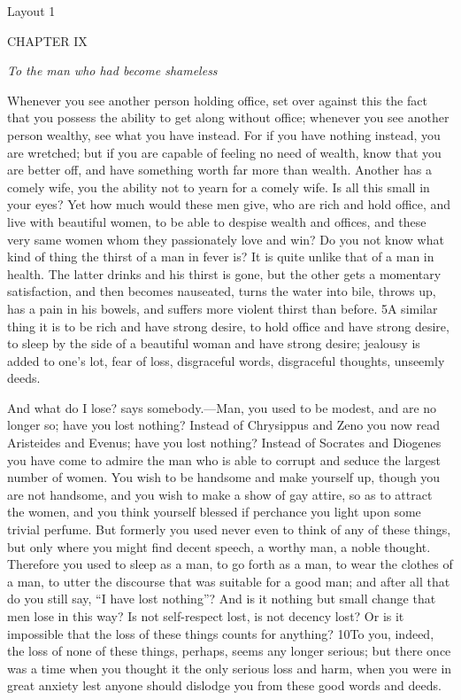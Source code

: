 

Layout 1

CHAPTER IX

\emph{To the man who had become shameless}

Whenever you see another person holding office, set over against this the fact that you possess the ability to get along without office; whenever you see another person wealthy, see what you have instead. For if you have nothing instead, you are wretched; but if you are capable of feeling no need of wealth, know that you are better off, and have something worth far more than wealth. Another has a comely wife, you the ability not to yearn for a comely wife. Is all this small in your eyes? Yet how much would these men give, who are rich and hold office, and live with beautiful women, to be able to despise wealth and offices, and these very same women whom they passionately love and win? Do you not know what kind of thing the thirst of a man in fever is? It is quite unlike that of a man in health. The latter drinks and his thirst is gone, but the other gets a momentary satisfaction, and then becomes nauseated, turns the water into bile, throws up, has a pain in his bowels, and suffers more violent thirst than before. 5A similar thing it is to be rich and have strong desire, to hold office and have strong desire, to sleep by the side of a beautiful woman and have strong desire; jealousy is added to one's lot, fear of loss, disgraceful words, disgraceful thoughts, unseemly deeds.

And what do I lose? says somebody.—Man, you used to be modest, and are no longer so; have you lost nothing? Instead of Chrysippus and Zeno you now read Aristeides and Evenus; have you lost nothing? Instead of Socrates and Diogenes you have come to admire the man who is able to corrupt and seduce the largest number of women. You wish to be handsome and make yourself up, though you are not handsome, and you wish to make a show of gay attire, so as to attract the women, and you think yourself blessed if perchance you light upon some trivial perfume. But formerly you used never even to think of any of these things, but only where you might find decent speech, a worthy man, a noble thought. Therefore you used to sleep as a man, to go forth as a man, to wear the clothes of a man, to utter the discourse that was suitable for a good man; and after all that do you still say, ``I have lost nothing''? And is it nothing but small change that men lose in this way? Is not self-respect lost, is not decency lost? Or is it impossible that the loss of these things counts for anything? 10To you, indeed, the loss of none of these things, perhaps, seems any longer serious; but there once was a time when you thought it the only serious loss and harm, when you were in great anxiety lest anyone should dislodge you from these good words and deeds.


